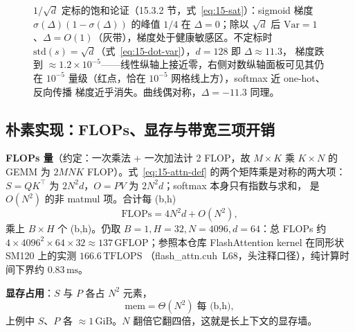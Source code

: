 \begin{figure}[H]
\caption{$1/\sqrt{d}$ 定标的饱和论证（15.3.2 节，式~\ref{eq:15-sat}）：sigmoid 梯度
$\sigma(\Delta)(1-\sigma(\Delta))$ 的峰值 $1/4$ 在 $\Delta=0$；除以 $\sqrt{d}$ 后
$\mathrm{Var}=1$、$\Delta=O(1)$（灰带），梯度处于健康敏感区。不定标时
$\mathrm{std}(s)=\sqrt{d}$（式~\ref{eq:15-dot-var}），$d=128$ 即 $\Delta\approx11.3$，
梯度跌到 $\approx1.2\times10^{-5}$——线性纵轴上接近零，右侧对数纵轴面板可见其仍在
$10^{-5}$ 量级（红点，恰在 $10^{-5}$ 网格线上方），softmax 近 one-hot、反向传播
梯度近乎消失。曲线偶对称，$\Delta=-11.3$ 同理。}
\label{fig:15-sqrt-d-scale}
\end{figure}

\subsection{朴素实现：FLOPs、显存与带宽三项开销}

\textbf{FLOPs 量}（约定：一次乘法 + 一次加法计 2 FLOP，故 $M{\times}K$ 乘 $K{\times}N$
的 GEMM 为 $2MNK$ FLOP）。式~\ref{eq:15-attn-def} 的两个矩阵乘是对称的两大项：
$S = QK^{\top}$ 为 $2N^{2}d$，$O = PV$ 为 $2N^{2}d$；softmax 本身只有指数与求和，
是 $O(N^{2})$ 的非 matmul 项。合计每 (b,h)
\begin{equation}
  \mathrm{FLOPs} = 4N^{2}d + O(N^{2}) ,
  \label{eq:15-naive-flops}
\end{equation}
乘上 $B \times H$ 个 (b,h)。仍取 $B{=}1, H{=}32, N{=}4096, d{=}64$：总 FLOPs 约
$4 \times 4096^{2} \times 64 \times 32 \approx 137\,\mathrm{GFLOP}$；参照本仓库
FlashAttention kernel 在同形状 SM120 上的实测 $166.6\,\mathrm{TFLOPS}$
（flash\_attn.cuh~L68，头注释口径），纯计算时间下界约 $0.83\,\mathrm{ms}$。

\textbf{显存占用}：$S$ 与 $P$ 各占 $N^{2}$ 元素，
\begin{equation}
  \mathrm{mem} = \Theta(N^{2}) \;\text{每 (b,h)} ,
  \label{eq:15-naive-mem}
\end{equation}
上例中 $S$、$P$ 各 $\approx 1\,\mathrm{GiB}$。$N$ 翻倍它翻四倍，这就是长上下文的显存墙。

